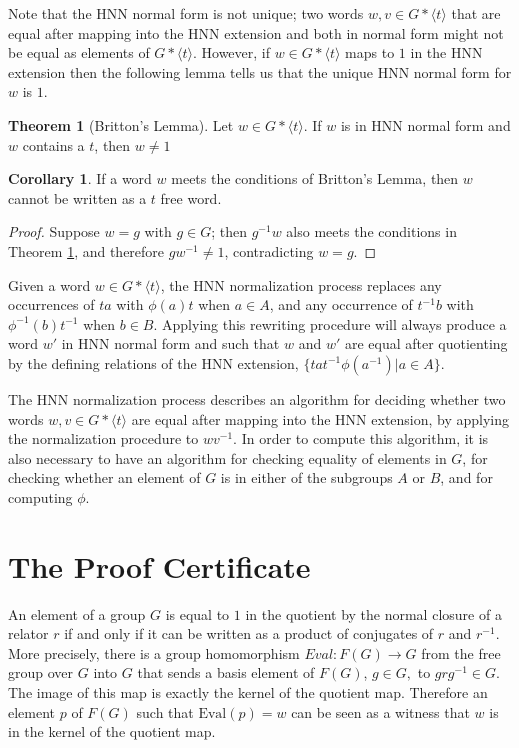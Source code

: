 \documentclass[11pt]{article} %
\theoremstyle{definition}
\newtheorem{theorem}{Theorem}[section]
\theoremstyle{definition}
\newtheorem{corol}{Corollary}[theorem]
\theoremstyle{definition}
\theoremstyle{definition}
\theoremstyle{definition}
\theoremstyle{definition}
\begin{document}
Note that the HNN normal form is not unique; two words $w, v \in G \ast \langle t \rangle$
that are equal after mapping into the HNN extension and both in normal form might not be
equal as elements of $G \ast \langle t \rangle$. However, if $w \in G \ast \langle t \rangle $
maps to $1$ in the HNN extension
then the following lemma tells us that the unique HNN normal form for $w$ is $1$.

\begin{theorem}[Britton's Lemma]\label{britton}
  Let $w \in G \ast \langle t \rangle$.
  If $w$ is in HNN normal form and $w$ contains a $t$, then $w \ne 1$
  \cite{CharlesF.Miller1968OBTA}
\end{theorem}

\begin{corol}\label{genbritton}
  If a word $w$ meets the conditions of Britton's Lemma,
  then $w$ cannot be written as a $t$ free word.
\end{corol}
\begin{proof}
Suppose $w = g$ with $g \in G$;
then $g^{-1}w$ also meets the conditions
in Theorem \ref{britton}, and therefore $gw^{-1}\ne 1$, contradicting $w = g$.
\end{proof}
Given a word $w \in G \ast \langle t \rangle$, the HNN normalization process
replaces any occurrences of $ta$ with $\phi(a)t$ when $a \in A$, and
any occurrence of $t^{-1}b$ with $\phi^{-1}(b)t^{-1}$ when $b \in B$.
Applying this rewriting procedure will always produce a word $w'$ in HNN normal form and
such that $w$ and $w'$ are equal after quotienting by the defining relations
of the HNN extension, $\{ta t^{-1} \phi(a^{-1}) | a \in A\}$.

The HNN normalization process describes an algorithm for deciding
whether two words $w, v \in G \ast \langle t \rangle$ are equal
after mapping into the HNN extension, by applying the normalization procedure to
 $wv^{-1}$.
In order to compute this algorithm, it is also necessary to have an algorithm for checking equality
of elements in $G$,
for checking whether an element of $G$ is in either of the subgroups $A$ or $B$, and for computing $\phi$.

\section{The Proof Certificate}

An element of a group $G$ is equal to $1$ in the quotient by the normal closure
of a relator $r$ if and only if it can be written as a product of conjugates of $r$ and $r^{-1}$.
More precisely, there is a group homomorphism $\textit{Eval}: F(G) \to G$ from the free group
over $G$ into $G$ that sends a basis element of $F(G)$,
$g \in G,$ to $grg^{-1} \in G$. The image of this map is exactly the kernel of the quotient map.
Therefore an element $p$ of $F(G)$ such that $\text{Eval}(p) = w$
can be seen as a witness that $w$ is in the kernel of the quotient map.
\end{document}
